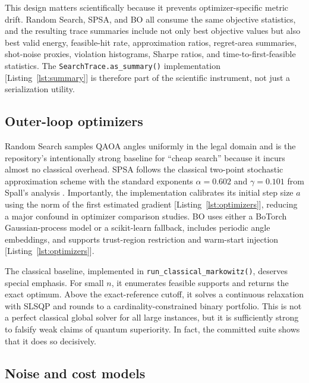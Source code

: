 \documentclass[11pt]{article}
\begin{document}
This design matters scientifically because it prevents optimizer-specific metric drift. Random Search, SPSA, and BO all consume the same objective statistics, and the resulting trace summaries include not only best objective values but also best valid energy, feasible-hit rate, approximation ratios, regret-area summaries, shot-noise proxies, violation histograms, Sharpe ratios, and time-to-first-feasible statistics. The \texttt{SearchTrace.as\_summary()} implementation [Listing~\ref{lst:summary}] is therefore part of the scientific instrument, not just a serialization utility.

\subsection{Outer-loop optimizers}

Random Search samples QAOA angles uniformly in the legal domain and is the repository's intentionally strong baseline for ``cheap search'' because it incurs almost no classical overhead. SPSA follows the classical two-point stochastic approximation scheme with the standard exponents \(\alpha=0.602\) and \(\gamma=0.101\) from Spall's analysis \cite{spall1992spsa}. Importantly, the implementation calibrates its initial step size \(a\) using the norm of the first estimated gradient [Listing~\ref{lst:optimizers}], reducing a major confound in optimizer comparison studies. BO uses either a BoTorch Gaussian-process model or a scikit-learn fallback, includes periodic angle embeddings, and supports trust-region restriction and warm-start injection [Listing~\ref{lst:optimizers}].

The classical baseline, implemented in \texttt{run\_classical\_markowitz()}, deserves special emphasis. For small \(n\), it enumerates feasible supports and returns the exact optimum. Above the exact-reference cutoff, it solves a continuous relaxation with SLSQP \cite{kraft1988slsqp} and rounds to a cardinality-constrained binary portfolio. This is not a perfect classical global solver for all large instances, but it is sufficiently strong to falsify weak claims of quantum superiority. In fact, the committed suite shows that it does so decisively.

\subsection{Noise and cost models}
\end{document}
